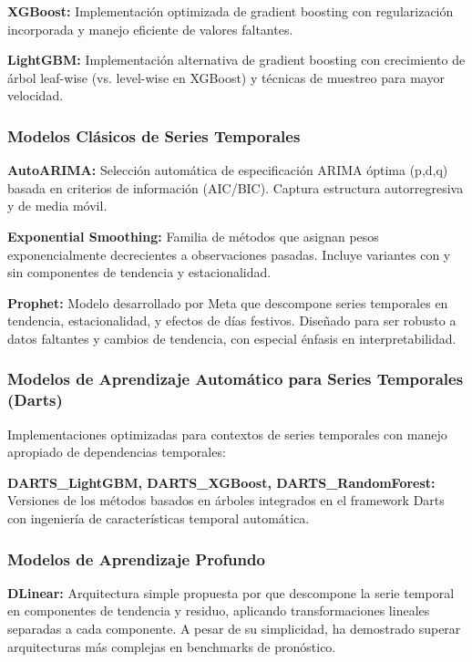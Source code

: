 \documentclass[11pt,a4paper]{article}
\begin{document}
\textbf{XGBoost:} Implementación optimizada de gradient boosting con regularización incorporada y manejo eficiente de valores faltantes.

\textbf{LightGBM:} Implementación alternativa de gradient boosting con crecimiento de árbol leaf-wise (vs. level-wise en XGBoost) y técnicas de muestreo para mayor velocidad.

\subsubsection{Modelos Clásicos de Series Temporales}

\textbf{AutoARIMA:} Selección automática de especificación ARIMA óptima (p,d,q) basada en criterios de información (AIC/BIC). Captura estructura autorregresiva y de media móvil.

\textbf{Exponential Smoothing:} Familia de métodos que asignan pesos exponencialmente decrecientes a observaciones pasadas. Incluye variantes con y sin componentes de tendencia y estacionalidad.

\textbf{Prophet:} Modelo desarrollado por Meta \citep{taylor2018} que descompone series temporales en tendencia, estacionalidad, y efectos de días festivos. Diseñado para ser robusto a datos faltantes y cambios de tendencia, con especial énfasis en interpretabilidad.

\subsubsection{Modelos de Aprendizaje Automático para Series Temporales (Darts)}

Implementaciones optimizadas para contextos de series temporales con manejo apropiado de dependencias temporales:

\textbf{DARTS\_LightGBM, DARTS\_XGBoost, DARTS\_RandomForest:} Versiones de los métodos basados en árboles integrados en el framework Darts con ingeniería de características temporal automática.

\subsubsection{Modelos de Aprendizaje Profundo}

\textbf{DLinear:} Arquitectura simple propuesta por \citet{zeng2023} que descompone la serie temporal en componentes de tendencia y residuo, aplicando transformaciones lineales separadas a cada componente. A pesar de su simplicidad, ha demostrado superar arquitecturas más complejas en benchmarks de pronóstico.
\end{document}
